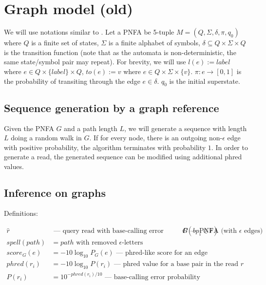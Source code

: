 \section{Graph model (old)}
We will use notations similar to \cite{pfau2010probabilistic}. Let a PNFA be 5-tuple $M = (Q, \Sigma, \delta, \pi, q_0)$ where $Q$ is a finite set of states, $\Sigma$ is a finite alphabet of symbols, $\delta \subseteq Q \times \Sigma \times Q$ is the transition function (note that as the automata is non-deterministic, the same state/symbol pair may repeat). For brevity, we will use $l(e) := label$ where $e \in Q \times \{ label \} \times Q$, $to(e) := v$ where $e \in Q \times \Sigma \times \{v\}$. $\pi : e \to [0, 1]$ is the probability of transiting through the edge $e \in \delta$. $q_0$ is the initial superstate.

\subsection{Sequence generation by a graph reference}
Given the PNFA $G$ and a path length $L$, we will generate a sequence with length $L$ doing a random walk in $G$. If for every node, there is an outgoing non-$\epsilon$ edge with positive probability, the algorithm terminates with probability $1$. In order to generate a read, the generated sequence can be modified using additional phred values.

\subsection{Inference on graphs}

Definitions:

\begin{align*}
	\hat{r} &\text{ --- query read with base-calling error probabilities $P(bp_i \in \hat{r})$}
    G &\text{ --- PNFA (with $\epsilon$ edges)} \\
    spell(path) &= \text{$path$ with removed $\epsilon$-letters} \\
	score_G(e) &= - 10 \log_{10} P_G(e)  \text{ --- phred-like score for an edge} \\
	phred(r_i) &= - 10 \log_{10} P(r_i)  \text{ --- phred value for a base pair in the read $r$} \\
	P(r_i) &= 10^{- phred(r_i) / 10}  \text{ --- base-calling error probability} \\
\end{align*}

